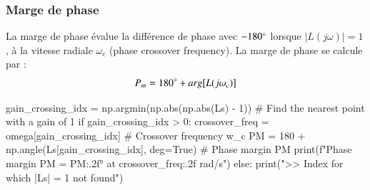 \subsubsection{Marge de phase}
La marge de phase évalue la différence de phase avec $-180\degree$ lorsque $|L(j\omega)| = 1$, à la vitesse radiale $\omega_c$ (phase crossover frequency).
La marge de phase se calcule par :
\[P_m = 180\degree + arg[L(j\omega_c)]\]
\begin{python*}
    gain_crossing_idx = np.argmin(np.abs(np.abs(Ls) - 1)) # Find the nearest point with a gain of 1
    if gain_crossing_idx > 0:
        crossover_freq = omega[gain_crossing_idx] # Crossover frequency w_c
        PM = 180 + np.angle(Ls[gain_crossing_idx], deg=True) # Phase margin PM
        print(f"Phase margin PM = {PM:.2f}° at {crossover_freq:.2f} rad/s")
    else:
        print(">> Index for which |Ls| = 1 not found")
\end{python*}

